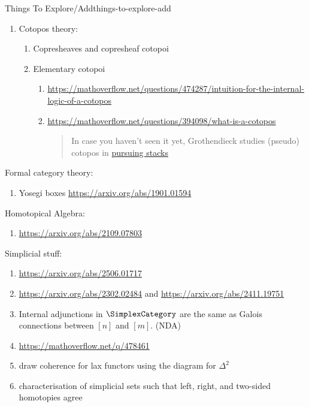 \begin{remark}{Things To Explore/Add}{things-to-explore-add}
\begin{enumerate}
        \item Cotopos theory:
            \begin{enumerate}
                \item Copresheaves and copresheaf cotopoi
                \item Elementary cotopoi
                    \begin{enumerate}
                        \item \url{https://mathoverflow.net/questions/474287/intuition-for-the-internal-logic-of-a-cotopos}
                        \item \url{https://mathoverflow.net/questions/394098/what-is-a-cotopos}
                            \begin{quote}
                                In case you haven’t seen it yet, Grothendieck studies (pseudo) cotopos in \href{n case you haven’t seen it yet, Grothendieck studies (pseudo) cotopos in pursuing stacks}{pursuing stacks}
                            \end{quote}
                    \end{enumerate}
            \end{enumerate}
    \end{enumerate}
    Formal category theory:
    \begin{enumerate}
        \item Yosegi boxes \url{https://arxiv.org/abs/1901.01594}
    \end{enumerate}
    Homotopical Algebra:
    \begin{enumerate}
        \item \url{https://arxiv.org/abs/2109.07803}
    \end{enumerate}
    Simplicial stuff:
    \begin{enumerate}
        \item \url{https://arxiv.org/abs/2506.01717}
        \item \url{https://arxiv.org/abs/2302.02484} and \url{https://arxiv.org/abs/2411.19751}
        \item Internal adjunctions in $\SimplexCategory$ are the same as Galois connections between $[n]$ and $[m]$. (NDA)
        \item \url{https://mathoverflow.net/q/478461}
        \item draw coherence for lax functors using the diagram for $\Delta^{2}$
        \item characterisation of simplicial sets such that left, right, and two-sided homotopies agree

\end{enumerate}
\end{remark}
